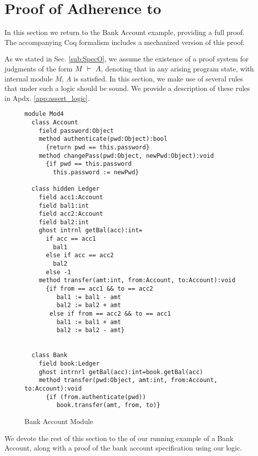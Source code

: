 \section{Proof of Adherence to {{}}}
\label{s:examples}

In this section we return to the Bank Account example, 
providing a full proof. 
The accompanying Coq formalism includes a mechanized version of this proof.




As we stated in Sec. \ref{sub:SpecO}, 
we assume the existence of a proof system for judgments
of the form $M\ \vdash\ A$, denoting that in 
any arising program state, with internal module $M$, $A$ is satisfied. 
In this section, we make use of several rules that under such a logic should be sound.
We provide a description of these rules in Apdx. \ref{app:assert_logic}. 

\begin{figure}[t]
\begin{lstlisting}[mathescape=true, frame=lines]
module Mod4
  class Account
    field password:Object
    method authenticate(pwd:Object):bool
      {return pwd == this.password}
    method changePass(pwd:Object, newPwd:Object):void
      {if pwd == this.password
        this.password := newPwd}

  class hidden Ledger
    field acc1:Account
    field bal1:int
    field acc2:Account
    field bal2:int
    ghost intrnl getBal(acc):int=
      if acc == acc1
        bal1
      else if acc == acc2
        bal2
      else -1
    method transfer(amt:int, from:Account, to:Account):void
      {if from == acc1 && to == acc2
         bal1 := bal1 - amt
         bal2 := bal2 + amt
       else if from == acc2 && to == acc1
         bal1 := bal1 + amt
         bal2 := bal2 - amt}
      

  class Bank
    field book:Ledger
    ghost intrnrl getBal(acc):int=book.getBal(acc)
    method transfer(pwd:Object, amt:int, from:Account, to:Account):void
      {if (from.authenticate(pwd))
         book.transfer(amt, from, to)}
\end{lstlisting}
\caption{Bank Account Module}
\label{f:ex-bank-short}
\end{figure}
We devote the rest of this section to the  of  our
running example of a Bank Account, along with a proof 
of the bank account specification using our \Nec logic.

